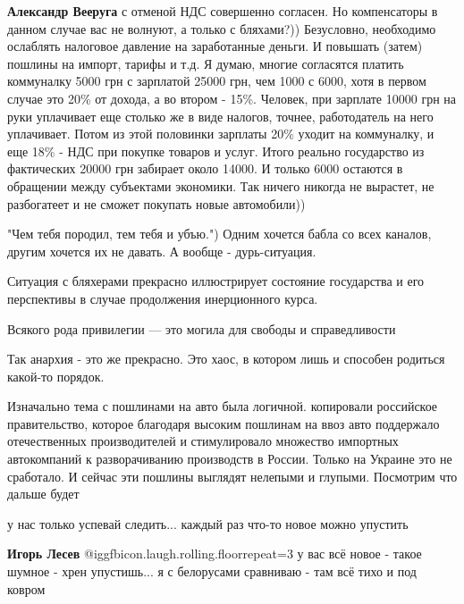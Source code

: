 \begin{itemize}
\begin{itemize}
\textbf{Александр Вееруга} с отменой НДС совершенно согласен.
Но компенсаторы в данном случае вас не волнуют, а только с бляхами?))
Безусловно, необходимо ослаблять налоговое давление на заработанные деньги. И повышать (затем) пошлины на импорт, тарифы и т.д.
Я думаю, многие согласятся платить коммуналку 5000 грн с зарплатой 25000 грн, чем 1000 с 6000, хотя в первом случае это 20\% от дохода, а во втором - 15\%.
Человек, при зарплате 10000 грн на руки уплачивает еще столько же в виде налогов, точнее, работодатель на него уплачивает. Потом из этой половинки зарплаты 20\% уходит на коммуналку, и еще 18\% - НДС при покупке товаров и услуг. Итого реально государство из фактических 20000 грн забирает около 14000. И только 6000 остаются в обращении между субъектами экономики.
Так ничего никогда не вырастет, не разбогатеет и не сможет покупать новые автомобили))

\end{itemize} %

"Чем тебя породил, тем тебя и убъю.") Одним хочется бабла со всех каналов, другим хочется их не давать. А вообще - дурь-ситуация.

Ситуация с бляхерами прекрасно иллюстрирует состояние государства и его перспективы в случае продолжения инерционного курса.

Всякого рода привилегии — это могила для свободы и справедливости

Так анархия - это же прекрасно. Это хаос, в котором лишь и способен родиться какой-то порядок.


Изначально тема с пошлинами на авто была логичной. копировали российское
правительство, которое благодаря высоким пошлинам на ввоз авто поддержало
отечественных производителей и стимулировало множество импортных автокомпаний к
разворачиванию производств в России. Только на Украине это не сработало. И
сейчас эти пошлины выглядят нелепыми и глупыми. Посмотрим что дальше будет

\begin{itemize} %
у нас только успевай следить... каждый раз что-то новое можно упустить

\textbf{Игорь Лесев}  @igg{fbicon.laugh.rolling.floor}{repeat=3} у вас всё новое - такое шумное - хрен упустишь... я с белорусами сравниваю - там всё тихо и под ковром
\end{itemize} %

\end{itemize} %
